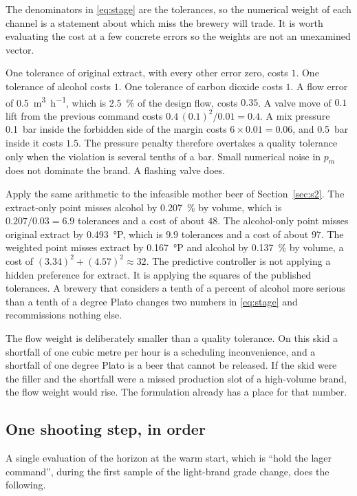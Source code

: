 The denominators in \eqref{eq:stage} are the tolerances, so the numerical weight of each channel is a statement about which miss the brewery will trade. It is worth evaluating the cost at a few concrete errors so the weights are not an unexamined vector.

One tolerance of original extract, with every other error zero, costs $1$. One tolerance of alcohol costs $1$. One tolerance of carbon dioxide costs $1$. A flow error of \SI{0.5}{\cubic\metre\per\hour}, which is \SI{2.5}{\percent} of the design flow, costs $0.35$. A valve move of $0.1$ lift from the previous command costs $0.4\,(0.1)^{2}/0.01 = 0.4$. A mix pressure \SI{0.1}{bar} inside the forbidden side of the margin costs $6\times 0.01 = 0.06$, and \SI{0.5}{bar} inside it costs $1.5$. The pressure penalty therefore overtakes a quality tolerance only when the violation is several tenths of a bar. Small numerical noise in $p_m$ does not dominate the brand. A flashing valve does.

Apply the same arithmetic to the infeasible mother beer of Section~\ref{sec:s2}. The extract-only point misses alcohol by \SI{0.207}{\percent} by volume, which is $0.207/0.03 = 6.9$ tolerances and a cost of about $48$. The alcohol-only point misses original extract by \SI{0.493}{\degree}P, which is $9.9$ tolerances and a cost of about $97$. The weighted point misses extract by \SI{0.167}{\degree}P and alcohol by \SI{0.137}{\percent} by volume, a cost of $(3.34)^{2}+(4.57)^{2}\approx 32$. The predictive controller is not applying a hidden preference for extract. It is applying the squares of the published tolerances. A brewery that considers a tenth of a percent of alcohol more serious than a tenth of a degree Plato changes two numbers in \eqref{eq:stage} and recommissions nothing else.

The flow weight is deliberately smaller than a quality tolerance. On this skid a shortfall of one cubic metre per hour is a scheduling inconvenience, and a shortfall of one degree Plato is a beer that cannot be released. If the skid were the filler and the shortfall were a missed production slot of a high-volume brand, the flow weight would rise. The formulation already has a place for that number.

\subsection{One shooting step, in order}
\label{sec:onestep}

A single evaluation of the horizon at the warm start, which is ``hold the lager command'', during the first sample of the light-brand grade change, does the following.


